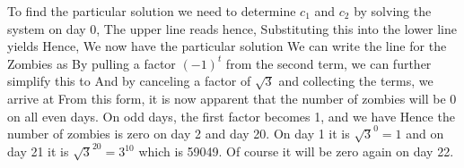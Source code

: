 \solution
To find the particular solution we need to determine $c_1$ and $c_2$ by solving the system on day 0,
The upper line reads 
hence,
Substituting this into the lower line yields
Hence,
We now have the particular solution 
We can write the line for the Zombies as
By pulling a factor $(-1)^t$ from the second term, we can further simplify this to 
And by canceling a factor of $\sqrt{3}$ and collecting the terms, we arrive at 
From this form, it is now apparent that the number of zombies will be 0 on all even days. On odd days, the first factor becomes 1, and we have 
Hence the number of zombies is zero on day 2 and day 20. On day 1 it is $\sqrt{3}^0=1$ and on day 21 it is $\sqrt{3}^{20} =3^{10}$ which is 59049. Of course it will be zero again on day 22. 
